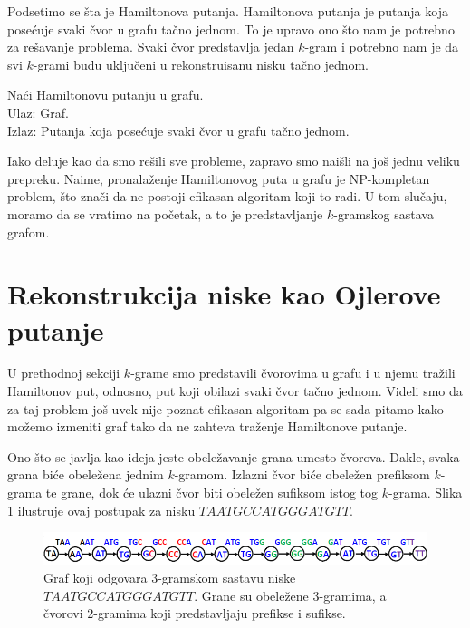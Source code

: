 Podsetimo se šta je Hamiltonova putanja. Hamiltonova putanja je putanja koja posećuje svaki čvor u grafu tačno jednom. To je upravo ono što nam je potrebno za rešavanje problema. Svaki čvor predstavlja jedan $k$-gram i potrebno nam je da svi $k$-grami budu uključeni u rekonstruisanu nisku tačno jednom.

\begin{problem}
	Naći Hamiltonovu putanju u grafu. \\
	Ulaz: Graf. \\
	Izlaz: Putanja koja posećuje svaki čvor u grafu tačno jednom.
\end{problem}

Iako deluje kao da smo rešili sve probleme, zapravo smo naišli na još jednu veliku prepreku. Naime, pronalaženje Hamiltonovog puta u grafu je NP-kompletan problem, što znači da ne postoji efikasan algoritam koji to radi. U tom slučaju, moramo da se vratimo na početak, a to je predstavljanje $k$-gramskog sastava grafom.

\section{Rekonstrukcija niske kao Ojlerove putanje}

U prethodnoj sekciji $k$-grame smo predstavili čvorovima u grafu i u njemu tražili Hamiltonov put, odnosno, put koji obilazi svaki čvor tačno jednom. Videli smo da za taj problem još uvek nije poznat efikasan algoritam pa se sada pitamo kako možemo izmeniti graf tako da ne zahteva traženje Hamiltonove putanje.

Ono što se javlja kao ideja jeste obeležavanje grana umesto čvorova. Dakle, svaka grana biće obeležena jednim $k$-gramom. Izlazni čvor biće obeležen prefiksom $k$-grama te grane, dok će ulazni čvor biti obeležen sufiksom istog tog $k$-grama. Slika \ref{slika:ojler} ilustruje ovaj postupak za nisku $TAATGCCATGGGATGTT$.

\begin{figure}[h]
	\centering
	\includegraphics[width=1\textwidth]{poglavlja/3/slike/ojler.png}
	\caption{Graf koji odgovara 3-gramskom sastavu niske $TAATGCCATGGGATGTT$. Grane su obeležene 3-gramima, a čvorovi 2-gramima koji predstavljaju prefikse i sufikse.}
	\label{slika:ojler}
\end{figure} 

